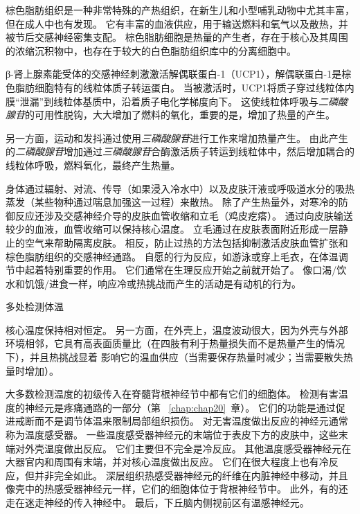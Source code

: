 \begin{proposition} \label{box:41_1}
	
	\quad \quad 棕色脂肪组织是一种非常特殊的产热组织，在新生儿和小型哺乳动物中尤其丰富，但在成人中也有发现。
	它有丰富的血液供应，用于输送燃料和氧气以及散热，并被节后交感神经密集支配。
	棕色脂肪细胞是热量的产生者，存在于核心及其周围的浓缩沉积物中，也存在于较大的白色脂肪组织库中的分离细胞中。
	
	\quad \quad β-肾上腺素能受体的交感神经刺激激活解偶联蛋白-1（UCP1），解偶联蛋白-1是棕色脂肪细胞特有的线粒体质子转运蛋白。
	当被激活时，UCP1将质子穿过线粒体内膜“泄漏”到线粒体基质中，沿着质子电化学梯度向下。
	这使线粒体呼吸与\textit{二磷酸腺苷}的可用性脱钩，大大增加了燃料的氧化，重要的是，增加了热量的产生。
	
	\quad \quad 另一方面，运动和发抖通过使用\textit{三磷酸腺苷}进行工作来增加热量产生。
	由此产生的\textit{二磷酸腺苷}增加通过\textit{三磷酸腺苷}合酶激活质子转运到线粒体中，然后增加耦合的线粒体呼吸，燃料氧化，最终产生热量。
	
\end{proposition}


身体通过辐射、对流、传导（如果浸入冷水中）以及皮肤汗液或呼吸道水分的吸热蒸发（某些物种通过喘息加强这一过程）来散热。
除了产生热量外，对寒冷的防御反应还涉及交感神经介导的皮肤血管收缩和立毛（鸡皮疙瘩）。
通过向皮肤输送较少的血液，血管收缩可以保持核心温度。
立毛通过在皮肤表面附近形成一层静止的空气来帮助隔离皮肤。
相反，防止过热的方法包括抑制激活皮肤血管扩张和棕色脂肪组织的交感神经通路。
自愿的行为反应，如游泳或穿上毛衣，在体温调节中起着特别重要的作用。
它们通常在生理反应开始之前就开始了。
像口渴/饮水和饥饿/进食一样，响应冷或热挑战而产生的活动是有动机的行为。


多处检测体温

核心温度保持相对恒定。
另一方面，在外壳上，温度波动很大，因为外壳与外部环境相邻，它具有高表面质量比（在四肢有利于热量损失而不是热量产生的情况下），并且热挑战显着 影响它的温血供应（当需要保存热量时减少；当需要散失热量时增加）。


大多数检测温度的初级传入在脊髓背根神经节中都有它们的细胞体。
检测有害温度的神经元是疼痛通路的一部分（第 ~\ref{chap:chap20}~章）。
它们的功能是通过促进戒断而不是调节体温来限制局部组织损伤。
对无害温度做出反应的神经元通常称为温度感受器。
一些温度感受器神经元的末端位于表皮下方的皮肤中，这些末端对外壳温度做出反应。
它们主要但不完全是冷反应。 其他温度感受器神经元在大器官内和周围有末端，并对核心温度做出反应。
它们在很大程度上也有冷反应，但并非完全如此。
深层组织热感受器神经元的纤维在内脏神经中移动，并且像壳中的热感受器神经元一样，它们的细胞体位于背根神经节中。
此外，有的还走在迷走神经的传入神经中。 最后，下丘脑内侧视前区有温感神经元。


